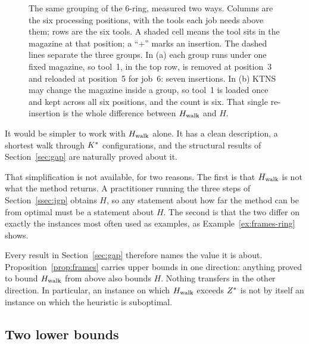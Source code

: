 \begin{figure}[t]
\caption{The same grouping of the $6$-ring, measured two ways. Columns are the six
processing positions, with the tools each job needs above them; rows are the six
tools. A shaded cell means the tool sits in the magazine at that position; a
``$+$'' marks an insertion. The dashed lines separate the three groups. In (a) each
group runs under one fixed magazine, so tool~1, in the top row, is removed at
position~3 and reloaded at position~5 for job~6: seven insertions. In (b) KTNS may
change the magazine inside a group, so tool~1 is loaded once and kept across all six
positions, and the count is six. That single re-insertion is the whole difference
between $H_{\mathrm{walk}}$ and $H$.}
\label{fig:frames}
\end{figure}

\begin{remark}\label{rem:frames}
It would be simpler to work with $H_{\mathrm{walk}}$ alone. It has a clean description, a
shortest walk through $K^{\ast}$ configurations, and the structural results of
Section~\ref{sec:gap} are naturally proved about it.

That simplification is not available, for two reasons. The first is that $H_{\mathrm{walk}}$ is
not what the method returns. A practitioner running the three steps of
Section~\ref{ssec:jgp} obtains $H$, so any statement about how far the method can be
from optimal must be a statement about $H$. The second is that the two differ on
exactly the instances most often used as examples, as Example~\ref{ex:frames-ring}
shows.

Every result in Section~\ref{sec:gap} therefore names the value it is about.
Proposition~\ref{prop:frames} carries upper bounds in one direction: anything proved
to bound $H_{\mathrm{walk}}$ from above also bounds $H$. Nothing transfers in the other
direction. In particular, an instance on which $H_{\mathrm{walk}}$ exceeds $Z^{\ast}$ is not by
itself an instance on which the heuristic is suboptimal.
\end{remark}

\subsection{Two lower bounds}\label{ssec:lb}

